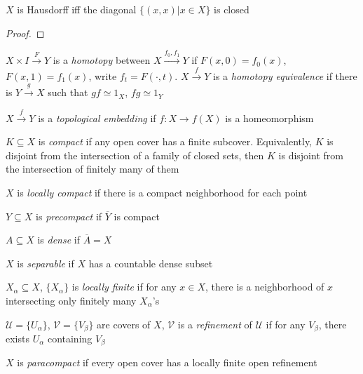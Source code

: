 \documentclass[main]{subfiles}
\begin{document}
\begin{lemma}
$X$ is Hausdorff iff the diagonal $\{(x,x)|x\in X\}$ is closed
\end{lemma}

\begin{proof}

\end{proof}

\begin{definition}
$X\times I\xrightarrow{F}Y$ is a \textit{homotopy} between $X\xrightarrow{f_0,f_1} Y$  if  $F(x,0)=f_0(x)$, $F(x,1)=f_1(x)$, write $f_t=F(\cdot,t)$. $X\xrightarrow{f} Y$ is a \textit{homotopy equivalence} if there is $Y\xrightarrow{g} X$ such that $gf\simeq1_X$, $fg\simeq1_Y$
\end{definition}

\begin{definition}
$X\xrightarrow f Y$ is a \textit{topological embedding} if $f:X\to f(X)$ is a homeomorphism
\end{definition}

\begin{definition}
$K\subseteq X$ is \textit{compact} if any open cover has a finite subcover. Equivalently, $K$ is disjoint from the intersection of a family of closed sets, then $K$ is disjoint from the intersection of finitely many of them \par
$X$ is \textit{locally compact} if there is a compact neighborhood for each point \par
$Y\subseteq X$ is \textit{precompact} if $\overline Y$ is compact
\end{definition}

\begin{definition}
$A\subseteq X$ is \textit{dense} if $\overline A=X$ \par
$X$ is \textit{separable} if $X$ has a countable dense subset
\end{definition}

\begin{definition}
$X_\alpha\subseteq X$, $\{X_\alpha\}$ is \textit{locally finite} if for any $x\in X$, there is a neighborhood of $x$ intersecting only finitely many $X_\alpha$'s \par
$\mathcal U=\{U_\alpha\}$, $\mathcal V=\{V_\beta\}$ are covers of $X$, $\mathcal V$ is a \textit{refinement} of $\mathcal U$ if for any $V_\beta$, there exists $U_\alpha$ containing $V_\beta$ \par
$X$ is \textit{paracompact} if every open cover has a locally finite open refinement
\end{definition}
\end{document}
